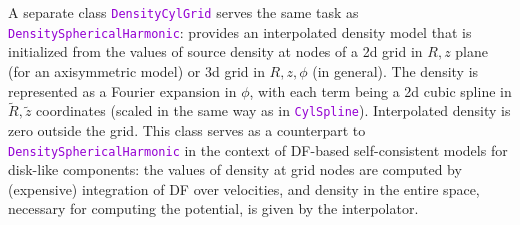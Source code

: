 \documentclass[12pt]{article}
\newcommand{\ttt}[1]{\textcolor{darkviolet}{\texttt{#1}}}
\begin{document}
\label{sec:DensityCylGrid} A separate class \ttt{DensityCylGrid} serves the same task as \ttt{DensitySphericalHarmonic}: provides an interpolated density model that is initialized from the values of source density at nodes of a 2d grid in $R,z$ plane (for an axisymmetric model) or 3d grid in $R,z,\phi$ (in general). The density is represented as a Fourier expansion in $\phi$, with each term being a 2d cubic spline in $\tilde R, \tilde z$ coordinates (scaled in the same way as in \ttt{CylSpline}). Interpolated density is zero outside the grid. This class serves as a counterpart to \ttt{DensitySphericalHarmonic} in the context of DF-based self-consistent models for disk-like components: the values of density at grid nodes are computed by (expensive) integration of DF over velocities, and density in the entire space, necessary for computing the potential, is given by the interpolator.


\end{document}
